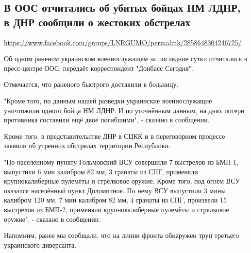 
 

\subsection{В ООС отчитались об убитых бойцах НМ ЛДНР, в ДНР сообщили о жестоких обстрелах}
\label{sec:19_07_2020.fb.lnr.9}
\url{https://www.facebook.com/groups/LNRGUMO/permalink/2858648304246725/}
  
Об одном раненом украинском военнослужащем за последние сутки отчитались в
пресс-центре ООС, передаёт корреспондент "Донбасс Сегодня".

Отмечается, что раненого быстрого доставили в больницу.

"Кроме того, по данным нашей разведки украинские военнослужащие уничтожили
одного бойца НМ ЛДНР. И по уточнённым данным, на днях потери противника
составили ещё двое погибшими", - сказано в сообщении.

Кроме того, в представительстве ДНР в СЦКК и в переговорном процессе заявили об
утренних обстрелах территории Республики.

"По населённому пункту Гольмовский ВСУ совершили 7 выстрелов из БМП-1,
выпустили 6 мин калибром 82 мм, 3 гранаты из СПГ, применяли крупнокалиберные
пулемёты и стрелковое оружие. Кроме того, под огнём ВСУ оказался населённый
пункт Доломитное. По нему ВСУ выпустили 3 мины калибром 120 мм, 7 мин калибром
82 мм, 4 гранаты из СПГ, произвели 15 выстрелов из БМП-2, применяли
крупнокалиберные пулемёты и стрелковое оружие", - сказано в сообщении.

Напомним, ранее мы сообщали, что на линии фронта обнаружен труп третьего
украинского диверсанта. 
